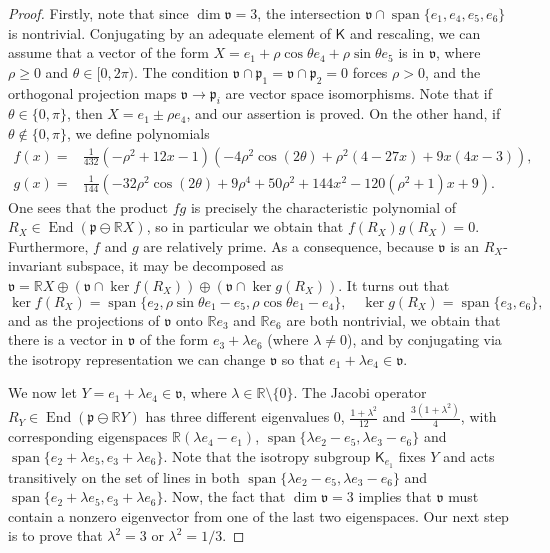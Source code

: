 \documentclass[11pt,a4paper,final]{amsart}
\newcommand{\g}{\mathfrak}
\newcommand{\R}{\mathbb{R}}
\newcommand{\vecspan}{\operatorname{span}}
\newcommand{\spann}{\operatorname{span}}
\theoremstyle{definition}
\begin{document}
\begin{proof}
	Firstly, note that since $\dim \g{v}=3$, the intersection $\g{v}\cap \vecspan\{e_{1},e_{4},e_{5},e_{6}\}$ is nontrivial.
	Conjugating by an adequate element of $\mathsf{K}$ and rescaling, we can assume that a vector of the form $X=e_{1}+\rho \cos \theta e_{4}+\rho \sin \theta e_{5}$ is in $\g{v}$, where $\rho\geq 0$ and $\theta \in [0,2\pi)$.
	The condition $\g{v}\cap \g{p}_{1}=\g{v}\cap \g{p}_{2}=0$ forces $\rho > 0$, and the orthogonal projection maps $\g{v}\to \g{p}_{i}$ are vector space isomorphisms.
	Note that if $\theta \in \{0,\pi\}$, then $X=e_{1}\pm \rho e_{4}$, and our assertion is proved.
	On the other hand, if $\theta\notin\{0,\pi\}$, we define polynomials
	\[
		\begin{aligned}
			f(x)={}&\frac{1}{432} \left(-\rho ^2+12
			x-1\right) \left(-4 \rho ^2 \cos (2
			\theta )+\rho ^2 (4-27 x)+9 x (4
			x-3)\right), \\
			g(x)={}&\frac{1}{144} \left(-32 \rho^2 \cos (2\theta )+9 \rho ^4+50 \rho ^2+144x^2-120 \left(\rho ^2+1\right)x+9\right).
		\end{aligned}
	\]
	One sees that the product $fg$ is precisely the characteristic polynomial of $R_{X}\in\operatorname{End}(\g{p}\ominus \R X)$, so in particular we obtain that $f(R_{X})g(R_{X})=0$.
	Furthermore, $f$ and $g$ are relatively prime.
	As a consequence, because $\g{v}$ is an $R_{X}$-invariant subspace, it may be decomposed as $\g{v}=\R X \oplus (\g{v}\cap \ker f(R_{X}))\oplus (\g{v}\cap \ker g(R_{X}))$.
	It turns out that
	\[
		\ker f(R_{X})=\spann \{e_{2},\rho \sin \theta e_{1}-e_{5},\rho \cos \theta e_{1}-e_{4}\}, \quad
		\ker g(R_{X})=\spann \{e_{3},e_{6}\},
	\]
	and as the projections of $\g{v}$ onto $\R e_{3}$ and $\R e_{6}$ are both nontrivial, we obtain that there is a vector in $\g{v}$ of the form $e_{3}+\lambda e_{6}$ (where $\lambda \neq 0$), and by conjugating via the isotropy representation we can change $\g{v}$ so that $e_{1}+\lambda e_{4}\in \g{v}$.
		
	We now let $Y=e_{1}+\lambda e_{4}\in \g{v}$, where $\lambda \in \R\setminus \{0\}$.
	The Jacobi operator $R_{Y}\in\operatorname{End}(\g{p}\ominus \R Y)$ has three different eigenvalues $0$, $\frac{1+\lambda^{2}}{12}$ and $\frac{3(1+\lambda^{2})}{4}$,	with corresponding eigenspaces $ \R(\lambda e_{4}-e_{1})$, $\vecspan\{\lambda e_{2}-e_{5},\lambda e_{3}-e_{6}\}$ and $\vecspan\{e_{2}+\lambda e_{5},e_{3}+\lambda e_{6}\}$.
	Note that the isotropy subgroup $\mathsf{K}_{e_{1}}$ fixes $Y$ and acts transitively on the set of lines in both $\vecspan\{\lambda e_{2}-e_{5},\lambda e_{3}-e_{6}\}$ and $\vecspan\{e_{2}+\lambda e_{5},e_{3}+\lambda e_{6}\}$.
	Now, the fact that $\dim \g{v}=3$ implies that $\g{v}$ must contain a nonzero eigenvector from one of the last two eigenspaces.
	Our next step is to prove that $\lambda^{2}=3$ or $\lambda^{2}=1/3$.
		

\end{proof}
\end{document}
